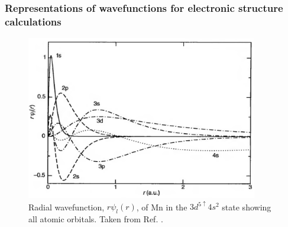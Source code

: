 \documentclass[11pt, twoside]{report}
\begin{document}
\subsubsection{Representations of wavefunctions for electronic structure calculations}
\begin{figure}[h!]
  \centering
    \includegraphics[width=0.9\textwidth]{figures/atomic_radial_wavefunction.png}
    \caption[Radial wavefunction, $r\psi_l(r)$, of Mn in the $3d^{5\uparrow}4s^2$ state showing all atomic orbitals.]{Radial wavefunction, $r\psi_l(r)$, of Mn in the $3d^{5\uparrow}4s^2$ state showing all atomic orbitals. Taken from Ref. .}
  \label{atomic_radial_wavefunction}
\end{figure}

\end{document}
